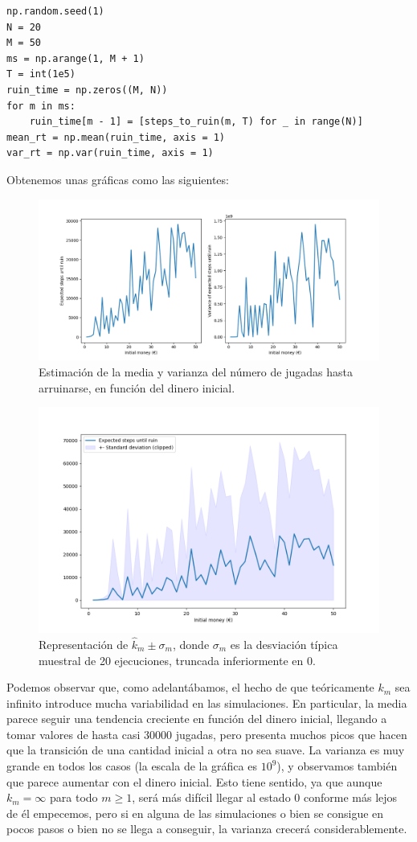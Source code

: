 \documentclass[11pt,a4paper]{article}
\begin{document}
\begin{verbatim}
np.random.seed(1)
N = 20
M = 50
ms = np.arange(1, M + 1)
T = int(1e5)
ruin_time = np.zeros((M, N))
for m in ms:
    ruin_time[m - 1] = [steps_to_ruin(m, T) for _ in range(N)]
mean_rt = np.mean(ruin_time, axis = 1)
var_rt = np.var(ruin_time, axis = 1)
\end{verbatim}

Obtenemos unas gráficas como las siguientes:
\newpage

\begin{figure}[h!]
  \centering
  \includegraphics[width=.95\textwidth]{img/gambler_mean_var}
  \caption{Estimación de la media y varianza del número de jugadas hasta arruinarse, en función del dinero inicial.}
\end{figure}

\begin{figure}[h!]
  \centering
  \includegraphics[width=.7\textwidth]{img/gambler_ci}
  \caption{Representación de $\hat k_m \pm \sigma_m$, donde $\sigma_m$ es la desviación típica muestral de 20 ejecuciones, truncada inferiormente en $0$.}
  \label{fig:std}
\end{figure}

Podemos observar que, como adelantábamos, el hecho de que teóricamente $k_m$ sea infinito introduce mucha variabilidad en las simulaciones. En particular, la media parece seguir una tendencia creciente en función del dinero inicial, llegando a tomar valores de hasta casi 30000 jugadas, pero presenta muchos picos que hacen que la transición de una cantidad inicial a otra no sea suave. La varianza es muy grande en todos los casos (la escala de la gráfica es $10^9$), y observamos también que parece aumentar con el dinero inicial. Esto tiene sentido, ya que aunque $k_m=\infty$ para todo $m\ge 1$, será más difícil llegar al estado $0$ conforme más lejos de él empecemos, pero si en alguna de las simulaciones o bien se consigue en pocos pasos o bien no se llega a conseguir, la varianza crecerá considerablemente.\\
\end{document}
